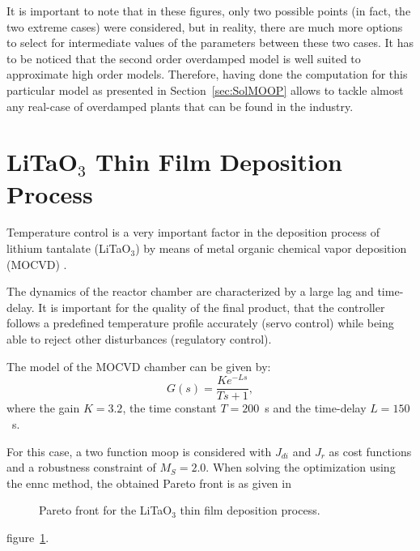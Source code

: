 It is important to note that in these figures, only two possible points (in fact, the two extreme cases) were considered, but in reality, there are much more options to select for intermediate values of the parameters between these two cases. It has to be noticed that the second order overdamped model is well suited to approximate high order models. Therefore, having done the computation for this particular model as presented in Section~\ref{sec:SolMOOP} allows to tackle almost any real-case of overdamped plants that can be found in the industry.
\section{LiTaO$_3$ Thin Film Deposition Process}
\label{sec:LiTAO3}
Temperature control is a very important factor in the deposition process of lithium tantalate (LiTaO$_3$) by means of metal organic chemical vapor deposition (MOCVD) \citep{Zhang2004}.

The dynamics of the reactor chamber are characterized by a large lag and time-delay. It is important for the quality of the final product, that the controller follows a predefined temperature profile accurately (servo control) while being able to reject other disturbances (regulatory control).

The model of the MOCVD chamber can be given by:
\begin{equation}
G(s) = \frac{K e^{-L s}}{T s+1},
\label{eq:GsLita}
\end{equation}
%
where the gain $K = 3.2$, the time constant $T = 200$~s and the time-delay $L = 150$~s.

For this case, a two function \gls{moop} is considered with $J_{di}$ and $J_{r}$ as cost functions and a robustness constraint of $M_S = 2.0$. When solving the optimization using the \gls{ennc} method, the obtained Pareto front is as given in %
\begin{figure}[tb]
	\centering
	\caption{Pareto front for the LiTaO$_3$ thin film deposition process.}
	\label{fig:LitaPareto}
\end{figure}
%
figure~\ref{fig:LitaPareto}.

